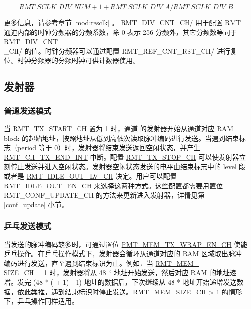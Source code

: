 \documentclass[main\_\_CN.tex]{subfiles}
\begin{document}
$$
RMT\_SCLK\_DIV\_NUM + 1 + RMT\_SCLK\_DIV\_A/RMT\_SCLK\_DIV\_B
$$

更多信息，请参考章节 \ref{mod:resclk} \textit{}。 RMT\_DIV\_CNT\_CH/ 用于配置 RMT 通道内部的时钟分频器的分频系数，除 0 表示 256 分频外，其它分频数等同于 RMT\_DIV\_CNT\\\_CH/ 的值。时钟分频器可以通过配置 RMT\_REF\_CNT\_RST\_CH/ 进行复位。时钟分频器的分频时钟可供计数器使用。

\subsection{发射器}

\subsubsection{普通发送模式}

当 \hyperref[fielddesc:RMTTXSTARTCHN]{RMT\_TX\_START\_CH} 置为 1 时，通道  的发射器开始从通道对应 RAM block 的起始地址，按照地址从低到高依次读取脉冲编码进行发送。当遇到结束标志（period 等于 0）时，发射器将结束发送返回空闲状态，并产生 \hyperref[int:RMTCHnTXENDINT]{RMT\_CH\_TX\_END\_INT} 中断。配置 \hyperref[fielddesc:RMTTXSTOPCHN]{RMT\_TX\_STOP\_CH} 可以使发射器立刻停止发送并进入空闲状态。发射器空闲状态发送的电平由结束标志中的 level 段或者是 \hyperref[fielddesc:RMTIDLEOUTLVCHN]{RMT\_IDLE\_OUT\_LV\_CH} 决定。用户可以配置 \hyperref[fielddesc:RMTIDLEOUTENCHN]{RMT\_IDLE\_OUT\_EN\_CH} 来选择这两种方式。这些配置都需要用置位 RMT\_CONF\_UPDATE\_CH 的方法来更新进入发射器，详情见第 \ref{conf_update} 小节。



\subsubsection{乒乓发送模式}

当发送的脉冲编码较多时，可通过置位 \hyperref[fielddesc:RMTMEMTXWRAPENCHN]{RMT\_MEM\_TX\_WRAP\_EN\_CH} 使能乒乓操作。在乒乓操作模式下，发射器会循环从通道对应的 RAM 区域取出脉冲编码进行发送，直至遇到结束标识为止。例如，当 \hyperref[fielddesc:RMTMEMSIZECHN]{RMT\_MEM\_\\SIZE\_CH} = 1 时，发射器将从 48 *  地址开始发送，然后对应 RAM 的地址递增。发完 (48 * ( + 1) - 1) 地址的数据后，下次继续从 48 *  地址开始递增发送数据，依此类推，遇到结束标识时停止发送。\hyperref[fielddesc:RMTMEMSIZECHN]{RMT\_MEM\_SIZE\_CH} > 1 的情形下，乒乓操作同样适用。
\end{document}
